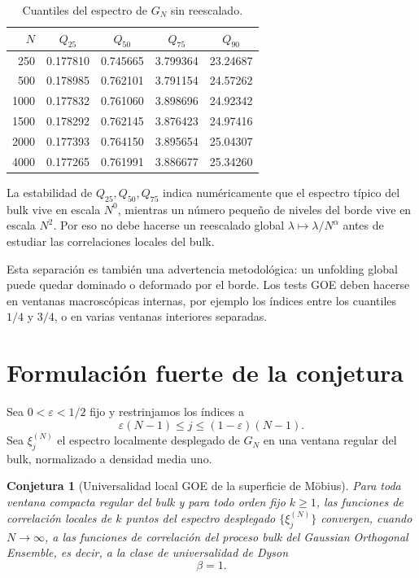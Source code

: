 \documentclass[11pt,a4paper]{article}
\newtheorem{conjecture}{Conjetura}
\begin{document}
\begin{table}[htbp]
\centering
\caption{Cuantiles del espectro de $G_N$ sin reescalado.}
\label{tab:bulk-quantiles}
\begin{tabular}{rcccc}
\toprule
$N$ & $Q_{25}$ & $Q_{50}$ & $Q_{75}$ & $Q_{90}$\\
\midrule
250  & 0.177810 & 0.745665 & 3.799364 & 23.24687\\
500  & 0.178985 & 0.762101 & 3.791154 & 24.57262\\
1000 & 0.177832 & 0.761060 & 3.898696 & 24.92342\\
1500 & 0.178292 & 0.762145 & 3.876423 & 24.97416\\
2000 & 0.177393 & 0.764150 & 3.895654 & 25.04307\\
4000 & 0.177265 & 0.761991 & 3.886677 & 25.34260\\
\bottomrule
\end{tabular}
\end{table}

La estabilidad de $Q_{25},Q_{50},Q_{75}$ indica numéricamente que el espectro típico del bulk vive en escala $N^0$, mientras un número pequeño de niveles del borde vive en escala $N^2$. Por eso no debe hacerse un reescalado global $\lambda\mapsto\lambda/N^\alpha$ antes de estudiar las correlaciones locales del bulk.

Esta separación es también una advertencia metodológica: un unfolding global puede quedar dominado o deformado por el borde. Los tests GOE deben hacerse en ventanas macroscópicas internas, por ejemplo los índices entre los cuantiles $1/4$ y $3/4$, o en varias ventanas interiores separadas.

\section{Formulación fuerte de la conjetura}

Sea $0<\varepsilon<1/2$ fijo y restrinjamos los índices a
\begin{equation}
\varepsilon(N-1)\le j\le(1-\varepsilon)(N-1).
\end{equation}
Sea $\xi_j^{(N)}$ el espectro localmente desplegado de $G_N$ en una ventana regular del bulk, normalizado a densidad media uno.

\begin{conjecture}[Universalidad local GOE de la superficie de Möbius]
\label{conj:strong-GOE}
Para toda ventana compacta regular del bulk y para todo orden fijo $k\ge1$, las funciones de correlación locales de $k$ puntos del espectro desplegado $\{\xi_j^{(N)}\}$ convergen, cuando $N\to\infty$, a las funciones de correlación del proceso bulk del Gaussian Orthogonal Ensemble, es decir, a la clase de universalidad de Dyson
\begin{equation}
\boxed{\beta=1.}
\end{equation}
\end{conjecture}
\end{document}
